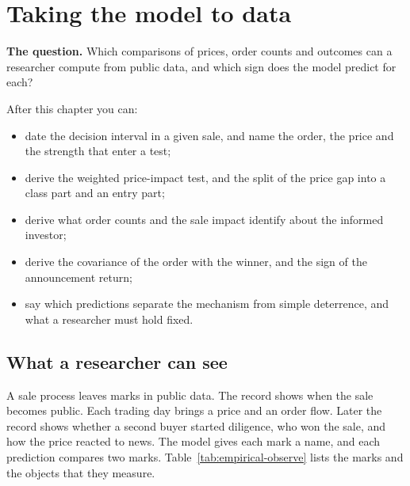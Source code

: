 \chapter{Taking the model to data}\label{ch:empirical}

\begin{chapterplan}
\textbf{The question.} Which comparisons of prices, order counts and outcomes can a researcher compute from public data, and which sign does the model predict for each?

After this chapter you can:
\begin{itemize}
\item date the decision interval in a given sale, and name the order, the price and the strength that enter a test;
\item derive the weighted price-impact test, and the split of the price gap into a class part and an entry part;
\item derive what order counts and the sale impact identify about the informed investor;
\item derive the covariance of the order with the winner, and the sign of the announcement return;
\item say which predictions separate the mechanism from simple deterrence, and what a researcher must hold fixed.
\end{itemize}
\end{chapterplan}

\section{What a researcher can see}\label{sec:empirical-observe}

A sale process leaves marks in public data. The record shows when the sale becomes public. Each trading day brings a price and an order flow. Later the record shows whether a second buyer started diligence, who won the sale, and how the price reacted to news. The model gives each mark a name, and each prediction compares two marks. Table~\ref{tab:empirical-observe} lists the marks and the objects that they measure.

